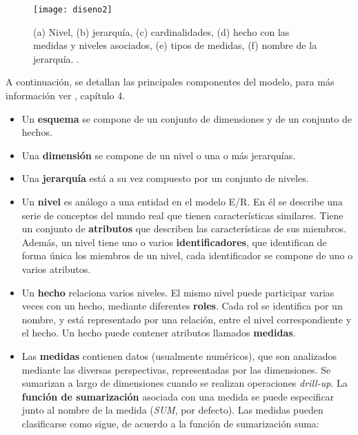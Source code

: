 \documentclass[a4paper,11pt]{article}
\begin{document}
      \begin{figure}[h]
        \begin{center}
          \texttt{[image: diseno2]}
          \caption{(a) Nivel, (b) jerarquía, (c) cardinalidades, (d) hecho con las medidas y niveles asociados, (e) tipos de medidas, (f) nombre de la jerarquía.
          \cite[p.~91]{VaismanZimanyi14}.}
          \label{disenoNotaciones}
        \end{center}
      \end{figure}
      
      A continuación, se detallan las principales componentes del modelo, para más información ver \cite{VaismanZimanyi14}, capítulo 4.
      
      \begin{itemize}
        \item Un \textbf{esquema} se compone de un conjunto de dimensiones y de un conjunto de hechos.
        \item Una \textbf{dimensión} se compone de un nivel o una o más jerarquías.
        \item Una \textbf{jerarquía} está a su vez compuesto por un conjunto de niveles. 
        \item Un \textbf{nivel} es análogo a una entidad en el modelo E/R. En él se describe una serie de conceptos del mundo real que tienen
        características similares. Tiene un conjunto de \textbf{atributos} que describen las características de sus miembros. Además, un nivel tiene uno o
        varios \textbf{identificadores}, que identifican de forma única los miembros de un nivel, cada identificador se compone de uno o varios atributos.
        \item Un \textbf{hecho} relaciona varios niveles. El mismo nivel puede participar varias veces con un hecho, mediante diferentes \textbf{roles}.
        Cada rol se identifica por un nombre, y está representado por una relación, entre el nivel correspondiente y el hecho.
        Un hecho puede contener atributos llamados \textbf{medidas}.
        \item Las \textbf{medidas} contienen datos (usualmente numéricos), que son analizados mediante las diversas perspectivas, representadas por las dimensiones.
        Se sumarizan a largo de dimensiones cuando se realizan operaciones \textit{drill-up}. La \textbf{función de sumarización} asociada
        con una medida se puede especificar junto al nombre de la medida (\textit{SUM}, por defecto). Las medidas pueden clasificarse como sigue,
        de acuerdo a la función de sumarización suma:

\end{itemize}
\end{document}
